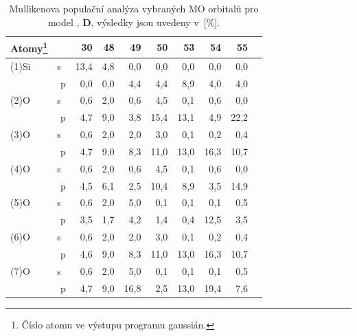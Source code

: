 \documentclass[
digital, %
table,   %
nolof,     %
nolot,     %
oneside,
]{fithesis3}
\begin{document}
\begin{table}[H]
\begin{minipage}{\textwidth}
\begin{center}
\caption{Mullikenova populační analýza vybraných MO orbitalů pro model , \textbf{D}, výsledky jsou uvedeny v~[\%].}
\begin{tabular}{|l|r|r|r|r|r|r|r|r|r|}
\hline
Atomy\footnote{Číslo atomu ve výstupu programu gaussián.}  \label{si_och3_6_MPA}&  & 30 & 48 & 49 & 50 & 53 & 54 & 55 \\ \hline
(1)Si & s~& 13,4  & 4,8  & 0,0  & 0,0  & 0,0  & 0,0  & 0,0  \\ \hline
& p & 0,0  & 0,0  & 4,4  & 4,4  & 8,9  & 4,0  & 4,0  \\ \hline
(2)O & s~& 0,6  & 2,0  & 0,6  & 4,5  & 0,1  & 0,6  & 0,0  \\ \hline
& p & 4,7  & 9,0  & 3,8  & 15,4  & 13,1  & 4,9  & 22,2  \\ \hline
(3)O & s~& 0,6  & 2,0  & 2,0  & 3,0  & 0,1  & 0,2  & 0,4  \\ \hline
& p & 4,7  & 9,0  & 8,3  & 11,0  & 13,0  & 16,3  & 10,7  \\ \hline
(4)O & s~& 0,6  & 2,0  & 0,6  & 4,5  & 0,1  & 0,6  & 0,0  \\ \hline
& p & 4,5  & 6,1  & 2,5  & 10,4  & 8,9  & 3,5  & 14,9  \\ \hline
(5)O & s~& 0,6  & 2,0  & 5,0  & 0,1  & 0,1  & 0,1  & 0,5  \\ \hline
& p & 3,5  & 1,7  & 4,2  & 1,4  & 0,4  & 12,5  & 3,5  \\ \hline
(6)O & s~& 0,6  & 2,0  & 2,0  & 3,0  & 0,1  & 0,2  & 0,4  \\ \hline
& p & 4,6  & 9,0  & 8,3  & 11,0  & 13,0  & 16,3  & 10,7  \\ \hline
(7)O & s~& 0,6  & 2,0  & 5,0  & 0,1  & 0,1  & 0,1  & 0,5  \\ \hline
& p & 4,7  & 9,0  & 16,8  & 2,5  & 13,0  & 19,4  & 7,6  \\ \hline
\end{tabular}\end{center}\end{minipage}\end{table}
\end{document}
